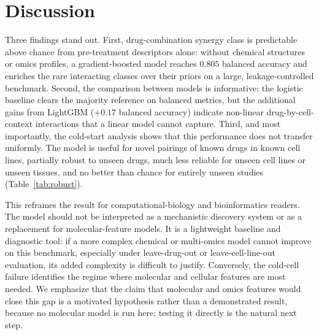 \documentclass{bmcart}
\begin{document}
\section*{Discussion}
Three findings stand out. First, drug-combination synergy class is predictable above chance from
pre-treatment descriptors alone: without chemical structures or omics profiles, a gradient-boosted
model reaches $0.805$ balanced accuracy and enriches the rare interacting classes over their priors on
a large, leakage-controlled benchmark. Second, the comparison between models is informative: the
logistic baseline clears the majority reference on balanced metrics, but the additional gains from
LightGBM ($+0.17$ balanced accuracy) indicate non-linear drug-by-cell-context interactions that a
linear model cannot capture. Third, and most importantly, the cold-start analysis shows that this
performance does not transfer uniformly. The model is useful for novel pairings of known drugs in
known cell lines, partially robust to unseen drugs, much less reliable for unseen cell lines or unseen
tissues, and no better than chance for entirely unseen studies (Table~\ref{tab:robust}).

This reframes the result for computational-biology and bioinformatics readers. The model should not be
interpreted as a mechanistic discovery system or as a replacement for molecular-feature models. It is
a lightweight baseline and diagnostic tool: if a more complex chemical or multi-omics model cannot
improve on this benchmark, especially under leave-drug-out or leave-cell-line-out evaluation, its added
complexity is difficult to justify. Conversely, the cold-cell failure identifies the regime where
molecular and cellular features are most needed. We emphasize that the claim that molecular and omics
features would close this gap is a motivated hypothesis rather than a demonstrated result, because no
molecular model is run here; testing it directly is the natural next step.
\end{document}
